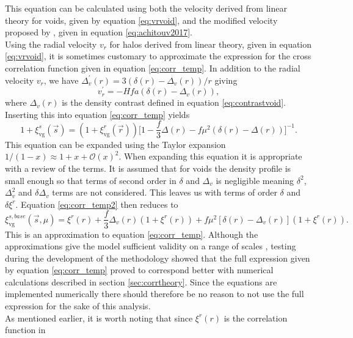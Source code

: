 This equation can be calculated using both the velocity derived from linear theory for voids, given by equation \ref{eq:vrvoid}, and the modified velocity proposed by \cite{Achitouv_streaming}, given in equation \ref{eq:achitouv2017}.
\\\indent
Using the radial velocity $v_r$ for halos derived from linear theory, given in equation \ref{eq:vrvoid}, it is sometimes customary to approximate the expression for the cross correlation function given in equation \ref{eq:corr_temp}. In addition to the radial velocity $v_r$, we have $\Delta_v^\prime(r)=3(\delta(r)-\Delta_v(r))/r$ giving
\begin{equation}
    v_r^\prime=-Hfa(\delta(r)-\Delta_v(r)),
\end{equation}
where $\Delta_v(r)$ is the density contrast defined in equation
\ref{eq:contrastvoid}. Inserting this into equation \ref{eq:corr_temp} yields
\begin{equation}\label{eq:corr_temp2}
    1 + \xi^s_{\mathrm{vg}}(\vec{s})=(1 + \xi^r_{\mathrm{vg}}(\vec{r})) \Big[1 -\frac{f}{3}\Delta(r)-f\mu^2(\delta(r)-\Delta(r))\Big]^{-1}.
\end{equation}
This equation can be expanded using the Taylor expansion
$1/(1-x)\approx1+x+\mathcal{O}(x)^2$. When expanding this equation it is
appropriate with a review of the terms. It is
assumed that for voids the density profile is small enough so that terms of
second order in $\delta$ and $\Delta_{v}$ is negligible meaning $\delta^2$,
$\Delta_{v}^2$ and $\delta\Delta_v$ terms are not considered. This leaves us with terms
of order $\delta$ and  $\delta\xi^r$. Equation
\ref{eq:corr_temp2} then reduces to
\begin{equation}\label{eq:corr_no_stream}
    \xi^{s,base}_{\mathrm{vg}}(\vec{s},\mu)=\xi^r(r)+\frac{f}{3}\Delta_v(r)(1+\xi^r(r))+f\mu^2[\delta(r)-\Delta_v(r)](1+\xi^r(r)).
\end{equation}
This is an approximation to equation \ref{eq:corr_temp}. Although the approximations give
the model sufficient validity on a range of scales \cite{BeyondBAO}, testing during the development of the methodology showed that the full expression given by equation \ref{eq:corr_temp} proved to correspond better with numerical calculations described in section \ref{sec:corrtheory}. Since the equations are implemented numerically there should therefore be no reason to not use the full expression for the sake of this analysis.\\\indent
As mentioned earlier, it is worth noting that since $\xi^r(r)$ is the correlation function in
